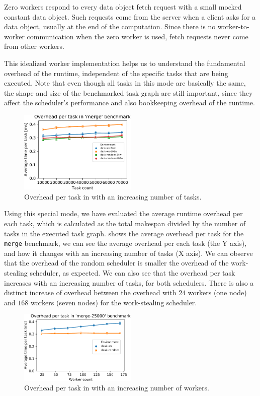 Zero workers respond to every data object fetch request with a small mocked constant data object.
Such requests come from the server when a client asks for a data object, usually at the end of the
computation. Since there is no worker-to-worker communication when the zero worker is used, fetch
requests never come from other workers.

This idealized worker implementation helps us to understand the fundamental overhead of the
\dask{} runtime, independent of the specific tasks that are being executed.
Note that even though all tasks in this mode are basically the same, the shape and size of the
benchmarked task graph are still important, since they affect the scheduler's performance and also
bookkeeping overhead of the runtime.

\begin{figure}
	\centering
	\includegraphics[width=0.5\textwidth]{imgs/rsds/charts/dask-merge-task-scaling}
	\caption{Overhead per task in \dask{} with an increasing number of tasks.}
	\label{fig:dask-merge-task-scaling}
\end{figure}

Using this special mode, we have evaluated the average runtime overhead per each task, which is
calculated as the total makespan divided by the number of tasks in the executed task graph.
 shows the average overhead per task for the \texttt{merge}
benchmark, we can see the average overhead per each task (the Y axis), and how it changes with an
increasing number of tasks (X axis). We can observe that the overhead of the random scheduler is
smaller the overhead of the work-stealing scheduler, as expected. We can also see that the overhead
per task increases with an increasing number of tasks, for both schedulers. There is also a
distinct increase of overhead between the overhead with $24$ workers (one
node) and $168$ workers (seven nodes) for the work-stealing scheduler.

\begin{figure}
	\centering
	\includegraphics[width=0.5\textwidth]{imgs/rsds/charts/dask-merge-worker-scaling}
	\caption{Overhead per task in \dask{} with an increasing number of workers.}
	\label{fig:dask-merge-worker-scaling}
\end{figure}


